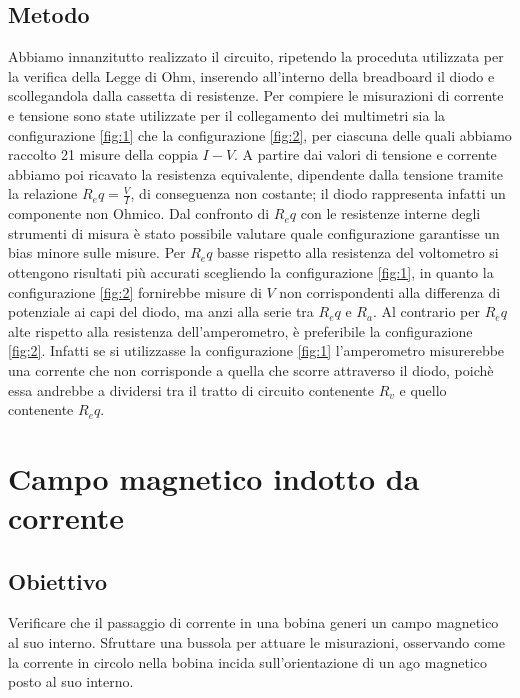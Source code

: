 \documentclass[a4paper]{article}
\begin{document}
\subsection{Metodo}
Abbiamo innanzitutto realizzato il circuito, ripetendo la proceduta utilizzata per la verifica della Legge di Ohm, inserendo all'interno della breadboard il diodo e scollegandola dalla cassetta di resistenze.
Per compiere le misurazioni di corrente e tensione sono state utilizzate per il collegamento dei multimetri sia la configurazione \ref{fig:1} che la configurazione \ref{fig:2},
per ciascuna delle quali abbiamo raccolto 21 misure della coppia \( I-V \). A partire dai valori di tensione e corrente abbiamo poi ricavato la resistenza equivalente,
dipendente dalla tensione tramite la relazione \( R_eq = \frac {V}{I} \), di conseguenza non costante; il diodo rappresenta infatti un componente non Ohmico.
Dal confronto di \(R_eq\) con le resistenze interne degli strumenti di misura è stato possibile valutare quale configurazione garantisse un bias minore sulle misure.
Per \(R_eq\) basse rispetto alla resistenza del voltometro si ottengono risultati più accurati scegliendo la configurazione \ref{fig:1}, in quanto la configurazione \ref{fig:2}
fornirebbe misure di \( V \) non corrispondenti alla differenza di potenziale ai capi del diodo, ma anzi alla serie tra \(R_eq\) e \(R_a\).
Al contrario per \(R_eq\) alte rispetto alla resistenza dell'amperometro, è preferibile la configurazione \ref{fig:2}.
Infatti se si utilizzasse la configurazione \ref{fig:1} l'amperometro misurerebbe una corrente che non corrisponde a quella che scorre attraverso il diodo,
poichè essa andrebbe a dividersi tra il tratto di circuito contenente \(R_v\) e quello contenente \(R_eq\).







\section{Campo magnetico indotto da corrente}
\subsection{Obiettivo}
Verificare che il passaggio di corrente in una bobina generi un campo magnetico al suo interno.
Sfruttare una bussola per attuare le misurazioni, osservando come la corrente in circolo nella bobina incida sull'orientazione di un ago magnetico posto al suo interno.
\end{document}
